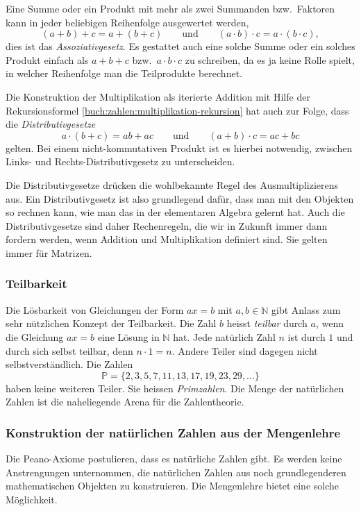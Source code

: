Eine Summe oder ein Produkt mit mehr als zwei Summanden bzw.~Faktoren
kann in jeder beliebigen Reihenfolge ausgewertet werden,
\[
(a+b)+c
=
a+(b+c)
\qquad\text{und}\qquad
(a\cdot b)\cdot c
=
a\cdot (b\cdot c),
\]
dies ist das {\em Assoziativgesetz}.
Es gestattet auch eine solche Summe oder ein solches Produkt einfach
als $a+b+c$ bzw.~$a\cdot b\cdot c$ zu schreiben, da es ja keine Rolle
spielt, in welcher Reihenfolge man die Teilprodukte berechnet.

Die Konstruktion der Multiplikation als iterierte Addition mit Hilfe
der Rekursionsformel \eqref{buch:zahlen:multiplikation-rekursion}
hat auch zur Folge, dass die {\em Distributivgesetze}
%
\[
a\cdot(b+c) = ab+ac
\qquad\text{und}\qquad
(a+b)\cdot c = ac+bc
\]
gelten.
Bei einem nicht-kommutativen Produkt ist es hierbei notwendig,
zwischen Links- und Rechts-Distributivgesetz zu unterscheiden.

Die Distributivgesetze drücken die wohlbekannte Regel des
Ausmultiplizierens aus.
Ein Distributivgesetz ist also grundlegend dafür, dass man mit den
Objekten so rechnen kann, wie man das in der elementaren Algebra 
gelernt hat.
Auch die Distributivgesetze sind daher Rechenregeln, die wir in
Zukunft immer dann fordern werden, wenn Addition und Multiplikation
definiert sind.
Sie gelten immer für Matrizen.

\subsubsection{Teilbarkeit}
Die Lösbarkeit von Gleichungen der Form $ax=b$ mit $a,b\in\mathbb{N}$
gibt Anlass zum sehr nützlichen Konzept der Teilbarkeit.
%
Die Zahl $b$ heisst {\em teilbar} durch $a$, wenn die Gleichung $ax=b$ eine
Lösung in $\mathbb{N}$ hat.
%
Jede natürlich Zahl $n$ ist durch $1$ und durch sich selbst teilbar,
denn $n\cdot 1 = n$.
Andere Teiler sind dagegen nicht selbstverständlich.
Die Zahlen
\[
\mathbb{P}
=
\{2,3,5,7,11,13,17,19,23,29,\dots\}
\]
haben keine weiteren Teiler. Sie heissen {\em Primzahlen}.
%
Die Menge der natürlichen Zahlen ist die naheliegende Arena
für die Zahlentheorie.
%

\subsubsection{Konstruktion der natürlichen Zahlen aus der Mengenlehre}
Die Peano-Axiome postulieren, dass es natürliche Zahlen gibt.
Es werden keine Anstrengungen unternommen, die natürlichen Zahlen
aus noch grundlegenderen mathematischen Objekten zu konstruieren.
Die Mengenlehre bietet eine solche Möglichkeit.

